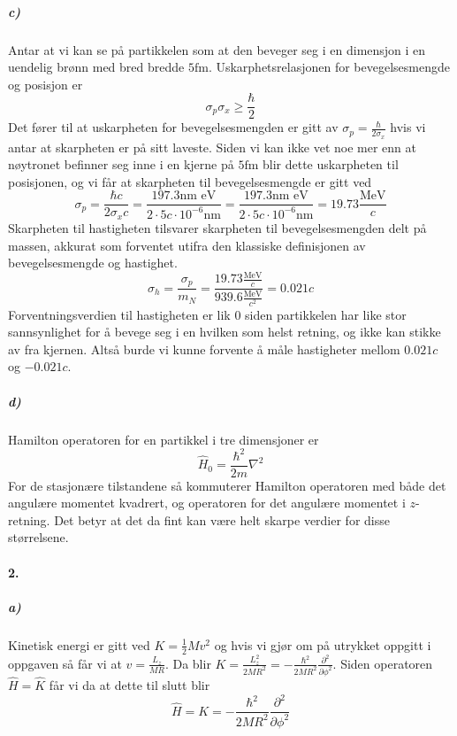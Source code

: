 \documentclass[11pt, A4paper,norsk]{article}
\begin{document}
			\subparagraph{c)}
				\begin{flushleft}
Antar at vi kan se på partikkelen som at den beveger seg i en dimensjon i en uendelig brønn med bred bredde $5 \text{fm}$. Uskarphetsrelasjonen for bevegelsesmengde og posisjon er
$$\sigma_p \sigma_x \geq \frac{\hbar}{2}$$
Det fører til at uskarpheten for bevegelsesmengden er gitt av $\sigma_p = \frac{\hbar}{2 \sigma_x}$ hvis vi antar at skarpheten er på sitt laveste. Siden vi kan ikke vet noe mer enn at nøytronet befinner seg inne i en kjerne på $5 \text{fm}$ blir dette uskarpheten til posisjonen, og vi får at skarpheten til bevegelsesmengde er gitt ved
$$\sigma_p = \frac{\hbar c}{2 \sigma_x c} = \frac{197.3 \text{nm eV}}{2 \cdot 5 c \cdot 10^{-6} \text{nm}} = \frac{197.3 \text{nm eV}}{2 \cdot 5 c \cdot 10^{-6} \text{nm}} = 19.73 \frac{\text{MeV}}{c}$$
Skarpheten til hastigheten tilsvarer skarpheten til bevegelsesmengden delt på massen, akkurat som forventet utifra den klassiske definisjonen av bevegelsesmengde og hastighet.
$$\sigma_h = \frac{\sigma_p}{m_N} = \frac{19.73 \frac{\text{MeV}}{c}}{939.6 \frac{\text{MeV}}{c^2}} = 0.021c$$
Forventningsverdien til hastigheten er lik $0$ siden partikkelen har like stor sannsynlighet for å bevege seg i en hvilken som helst retning, og ikke kan stikke av fra kjernen. Altså burde vi kunne forvente å måle hastigheter mellom $0.021c$ og $- 0.021c$.
				\end{flushleft}
			









			\subparagraph{d)}
				\begin{flushleft}
Hamilton operatoren for en partikkel i tre dimensjoner er
$$\hat{H}_0 = \frac{\hbar^2}{2m} \nabla^2$$
For de stasjonære tilstandene så kommuterer Hamilton operatoren med både det angulære momentet kvadrert, og operatoren for det angulære momentet i $z$-retning. Det betyr at det da fint kan være helt skarpe verdier for disse størrelsene.
				\end{flushleft}








\clearpage
		\paragraph{2.}
			\subparagraph{a)}
				\begin{flushleft}
Kinetisk energi er gitt ved $K = \frac{1}{2} M v^2$ og hvis vi gjør om på utrykket oppgitt i oppgaven så får vi at $v = \frac{L_z}{M R}$. Da blir $K = \frac{L_z^2}{2MR^2} = - \frac{\hbar^2}{2MR^2} \frac{\partial^2}{\partial \phi^2}$. Siden operatoren $\hat{H} = \hat{K}$ får vi da at dette til slutt blir
$$\hat{H} = K = - \frac{\hbar^2}{2MR^2} \frac{\partial^2}{\partial \phi^2}$$
				\end{flushleft}
\end{document}
